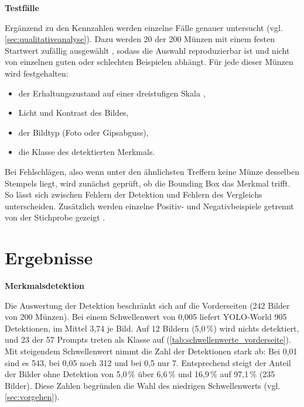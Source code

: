 \vspace{\baselineskip}

\noindent \textbf{Testfälle}

\noindent Ergänzend zu den Kennzahlen werden einzelne Fälle genauer untersucht (vgl. \cref{sec:qualitativeanalyse}). Dazu werden 20 der 200 Münzen mit einem festen Startwert zufällig ausgewählt , sodass die Auswahl reproduzierbar ist und nicht von einzelnen guten oder schlechten Beispielen abhängt. Für jede dieser Münzen wird festgehalten:
\begin{itemize}
    \item der Erhaltungszustand auf einer dreistufigen Skala ,
    \item Licht und Kontrast des Bildes,
    \item der Bildtyp (Foto oder Gipsabguss),
    \item die Klasse des detektierten Merkmals.
\end{itemize}
Bei Fehlschlägen, also wenn unter den ähnlichsten Treffern keine Münze desselben Stempels liegt, wird zunächst geprüft, ob die Bounding Box das Merkmal trifft. So lässt sich zwischen Fehlern der Detektion und Fehlern des Vergleichs unterscheiden. Zusätzlich werden einzelne Positiv- und Negativbeispiele getrennt von der Stichprobe gezeigt .

\section{Ergebnisse}
\label{sec:ergebnisse}
\textbf{Merkmalsdetektion}

\noindent Die Auswertung der Detektion beschränkt sich auf die Vorderseiten (242 Bilder von 200 Münzen). Bei einem Schwellenwert von 0,005 liefert YOLO-World 905 Detektionen, im Mittel 3,74 je Bild. Auf 12 Bildern (5,0\,\%) wird nichts detektiert, und 23 der 57 Prompts treten als Klasse auf (\cref{tab:schwellenwerte_vorderseite}). Mit steigendem Schwellenwert nimmt die Zahl der Detektionen stark ab: Bei 0,01 sind es 543, bei 0,05 noch 312 und bei 0,5 nur 7. Entsprechend steigt der Anteil der Bilder ohne Detektion von 5,0\,\% über 6,6\,\% und 16,9\,\% auf 97,1\,\% (235 Bilder). Diese Zahlen begründen die Wahl des niedrigen Schwellenwerts (vgl. \cref{sec:vorgehen}).

